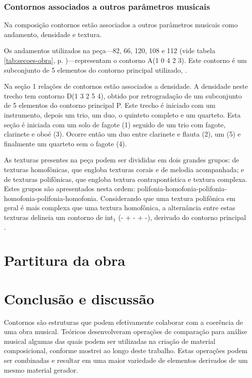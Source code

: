 \subsection{Contornos associados a outros parâmetros musicais}
\label{sec:cont-assoc-outr}

Na composição \obra{} contornos estão associados a outros parâmetros
musicais como andamento, densidade e textura.

Os andamentos utilizados na peça---82, 66, 120, 108 e 112 (vide tabela
\ref{tab:secoes-obra}, p. \pageref{tab:secoes-obra})---representam o
contorno A(1 0 4 2 3). Este contorno é um subconjunto de 5 elementos
do contorno principal utilizado, \contpr{}.

Na seção 1 relações de contornos estão associados a densidade. A
densidade neste trecho tem contorno D(1 3 2 5 4), obtido por
retrogradação de um subconjunto de 5 elementos do contorno principal
P. Este trecho é iniciado com um instrumento, depois um trio, um duo,
o quinteto completo e um quarteto. Esta seção é iniciada com um solo
de fagote (1) seguido de um trio com fagote, clarinete e oboé
(3). Ocorre então um duo entre clarinete e flauta (2), um 
(5) e finalmente um quarteto sem o fagote (4).

As texturas presentes na peça podem ser divididas em dois grandes
grupos: de texturas homofônicas, que engloba texturas corais e de
melodia acompanhada; e de texturas polifônicas, que engloba textura
contrapontística e textura complexa. Estes grupos são apresentados
nesta ordem:
polifonia-homofonia-polifonia-homofonia-polifonia-homofonia. Considerando
que uma textura polifônica em geral é mais complexa que uma textura
homofônica, a alternância entre estas texturas delineia um contorno de
int$_1$ (- + - + -), derivado do contorno principal \contpr{}.

\chapter{Partitura da obra \obra{}}
\label{cha:partitura-da-obra}



\chapter{Conclusão e discussão}
\label{cha:conclusao-e-discussao}

Contornos são estruturas que podem efetivamente colaborar com a
coerência de uma obra musical. Teóricos desenvolveram operações de
comparação para análise musical algumas das quais podem ser utilizadas
na criação de material composicional, conforme mostrei ao longo deste
trabalho. Estas operações podem ser combinadas e resultar em uma maior
variedade de elementos derivados de um mesmo material gerador.

